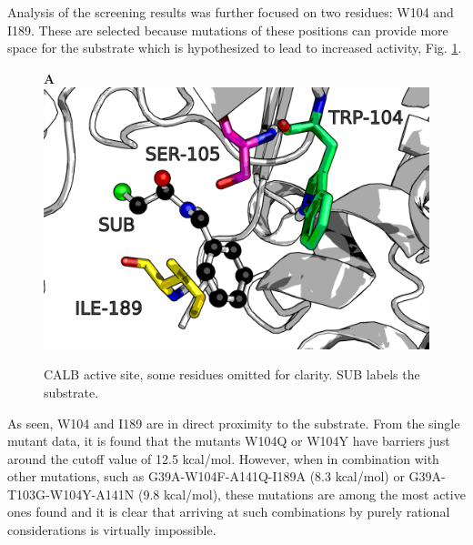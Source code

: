 Analysis of the screening results was further focused on two residues: W104 and I189.
These are selected because mutations of these positions can provide more space for the substrate which is hypothesized to lead to increased activity, Fig. \ref{fig:calb-views}.
\begin{figure}[htbp] 
\textbf{A}
\includegraphics[width=0.95\linewidth]{calb-active-site.png}
\caption{
CALB active site, some residues omitted for clarity.
SUB labels the substrate.
}
\label{fig:calb-views}
\end{figure}
As seen, W104 and I189 are in direct proximity to the substrate.
From the single mutant data, it is found that the mutants W104Q or W104Y have barriers just around the cutoff value of 12.5 kcal/mol.
However, when in combination with other mutations, such as G39A-W104F-A141Q-I189A (8.3 kcal/mol) or G39A-T103G-W104Y-A141N (9.8 kcal/mol), these mutations are among the most active ones found and it is clear that arriving at such combinations by purely rational considerations is virtually impossible.\\
